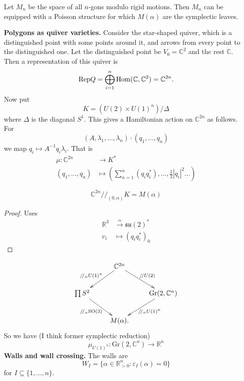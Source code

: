 \begin{remark}
\label{remark-Hausmann-Knutson}
Let $M_n$ be the space of all $n$-gons
modulo rigid motions. Then $M_n$
can be equipped with a Poisson structure
for which $M(\alpha)$ are the symplectic
leaves.

\medskip\noindent
{\bf Polygons as quiver varieties.}
Consider the star-shaped quiver,
which is a distinguished point with some
points around it,
and arrows from every point to the
distinguished one.
Let the distinguished point be
$V_0=\mathbb{C}^2$ and
the rest $\mathbb{C}$. Then a representation
of this quiver
is
$$
\text{Rep}Q=\bigoplus_{i=1}^n
\mathop{\mathrm{Hom}}\nolimits(\mathbb{C},\mathbb{C}^2)=\mathbb{C}^{2n}
.
$$
Now put
$$
K=(U(2) \times U(1)^n)/\Delta
$$
where $\Delta$ is the diagonal $S^1$.
This gives a Hamiltonian action on
$\mathbb{C}^{2n}$
as follows. For
$$
(A,\lambda_1,\ldots,\lambda_n)\cdot
(q_1,\ldots,q_n)
$$
we map
$q_i \mapsto  A^{-1}q_i \lambda_i$.
That is
$$
\begin{aligned}
\mu: \mathbb{C}^{2n} &\longrightarrow K^* \\
(q_1,\ldots,q_n) &\longmapsto
\left(\sum_{n=1}^n (q_iq_i^*
),\ldots,\frac{1}{2}|q_i|^2\ldots\right)
\end{aligned}
$$

\begin{theorem}
\label{theorem-Hausmann-Knutson}
$$
\mathbb{C}^{2n}/\!/_{(0,\alpha)}K=M(\alpha)
$$
\end{theorem}

\begin{proof}
Uses
$$
\begin{aligned}
\mathbb{R}^3  &\xrightarrow{\simeq}
\mathfrak{su}(2)^* \\
v_i &\longmapsto (q_iq_i^*)_0
\end{aligned}
$$
\end{proof}
\end{remark}

$$
\xymatrix{
&\mathbb{C}^{2n}\ar[dl]_{/\!/_\alpha U(1)^n}
\ar[dr]^{/\!/U(2)}\\
\prod S^2 \ar[dr]_{/\!/_\alpha \text{SO}(3)}
 &  &
 \text{Gr}(2,\mathbb{C}^n)\ar[dl]^{/\!/
 _\alpha
 U(1)^n}\\
&M(\alpha).
}
$$
So we have (I think former symplectic
reduction)
$$
\mu_{U(1)^n}:\text{Gr}(2,\mathbb{C}^n)\to
\mathbb{R}^n
$$
\medskip\noindent
{\bf Walls and wall crossing.}
The walls are
$$
W_I=\{\alpha \in
\mathbb{R}^n_{>0}:\varepsilon_I(\alpha)=0\}
$$
for $I \subseteq \{1,\ldots,n\}$.

